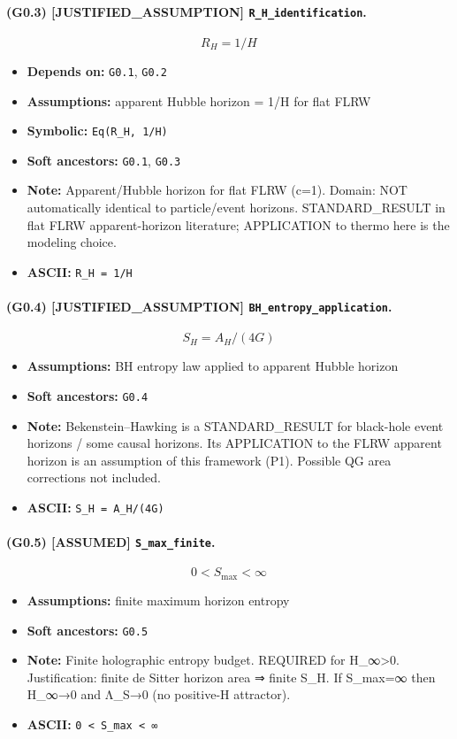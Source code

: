 \documentclass[11pt,a4paper]{article}
\theoremstyle{remark}\newtheorem*{caution}{Caution}
\newcommand{\tagbox}[1]{\textsc{[#1]}}
\begin{document}
\paragraph{(G0.3) \tagbox{JUSTIFIED\_ASSUMPTION} \texttt{R\_H\_identification}.}
\begin{equation}
R_H=1/H
\tag{G0.3}
\end{equation}
\begin{itemize}\setlength{\itemsep}{0.12em}
\item \textbf{Depends on:} \texttt{G0.1}, \texttt{G0.2}
\item \textbf{Assumptions:} apparent Hubble horizon = 1/H for flat FLRW
\item \textbf{Symbolic:} \texttt{Eq(R\_H, 1/H)}
\item \textbf{Soft ancestors:} \texttt{G0.1}, \texttt{G0.3}
\item \textbf{Note:} Apparent/Hubble horizon for flat FLRW (c=1). Domain: NOT automatically identical to particle/event horizons. STANDARD\_RESULT in flat FLRW apparent-horizon literature; APPLICATION to thermo here is the modeling choice.
\item \textbf{ASCII:} \texttt{R\_H = 1/H}
\end{itemize}
\paragraph{(G0.4) \tagbox{JUSTIFIED\_ASSUMPTION} \texttt{BH\_entropy\_application}.}
\begin{equation}
S_H=A_H/(4G)
\tag{G0.4}
\end{equation}
\begin{itemize}\setlength{\itemsep}{0.12em}
\item \textbf{Assumptions:} BH entropy law applied to apparent Hubble horizon
\item \textbf{Soft ancestors:} \texttt{G0.4}
\item \textbf{Note:} Bekenstein–Hawking is a STANDARD\_RESULT for black-hole event horizons / some causal horizons. Its APPLICATION to the FLRW apparent horizon is an assumption of this framework (P1). Possible QG area corrections not included.
\item \textbf{ASCII:} \texttt{S\_H = A\_H/(4G)}
\end{itemize}
\paragraph{(G0.5) \tagbox{ASSUMED} \texttt{S\_max\_finite}.}
\begin{equation}
0<S_{\max}<\infty
\tag{G0.5}
\end{equation}
\begin{itemize}\setlength{\itemsep}{0.12em}
\item \textbf{Assumptions:} finite maximum horizon entropy
\item \textbf{Soft ancestors:} \texttt{G0.5}
\item \textbf{Note:} Finite holographic entropy budget. REQUIRED for H\_∞>0. Justification: finite de Sitter horizon area ⇒ finite S\_H. If S\_max=∞ then H\_∞→0 and Λ\_S→0 (no positive-H attractor).
\item \textbf{ASCII:} \texttt{0 < S\_max < ∞}
\end{itemize}
\end{document}
